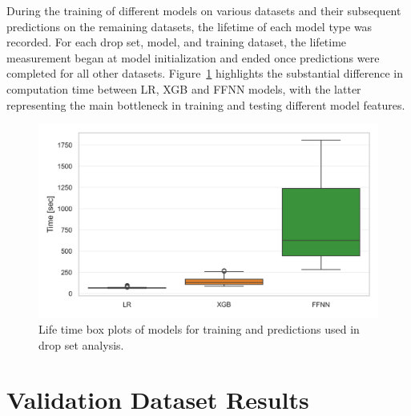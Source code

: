 During the training of different models on various datasets and their subsequent predictions on the remaining datasets,
the lifetime of each model type was recorded.
For each drop set, model, and training dataset, the lifetime measurement began at model initialization and ended once
predictions were completed for all other datasets. Figure~\ref{fig:lifetime_model} highlights the substantial difference in computation time
between \gls{LR}, \gls{XGB} and \gls{FFNN} models, with the latter representing the main bottleneck in training and testing different model features.

\begin{figure}[!ht]
	\begin{center}
		\includegraphics[width = .7\textwidth]{pictures/feature_filter/life_time_models.png}
		\caption{Life time box plots of models for training and predictions used in drop set analysis.}
		\label{fig:lifetime_model}
	\end{center}
\end{figure}

\clearpage
\section{Validation Dataset Results}
\label{app:se:validation_results}

